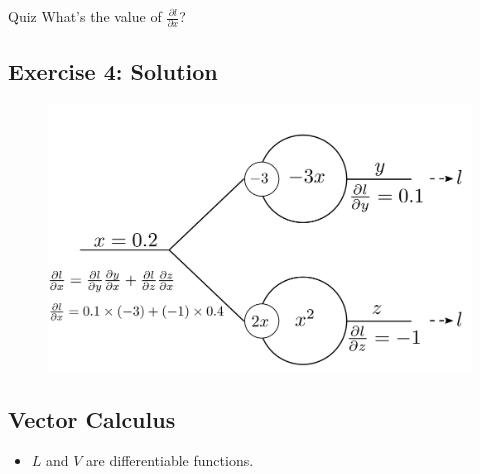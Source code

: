 \documentclass{book}
\begin{document}
\begin{block}{Quiz}
What's the value of $\frac{\partial l}{\partial x}$?
\end{block}

\subsection{Exercise 4: Solution}

\begin{figure}[h]
    \centering
    \includegraphics[width=\textwidth]{bp_split_sol.png}
\end{figure}

\subsection{Vector Calculus}

\begin{itemize}
\item $L$ and $V$ are differentiable functions.
\end{itemize}
\end{document}

